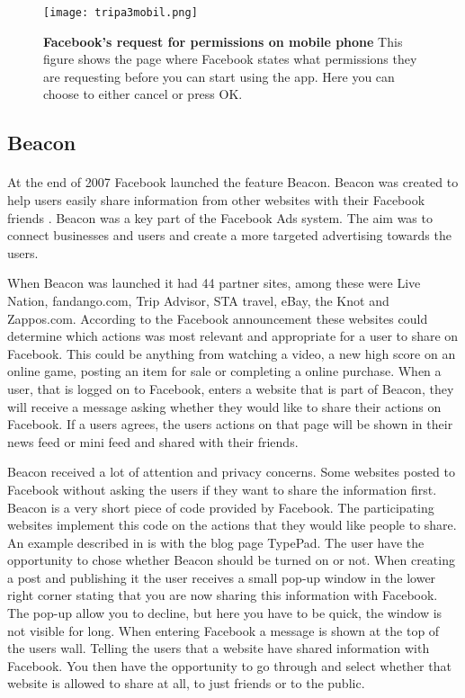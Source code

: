 \begin{figure}[h!]
\centering
\texttt{[image: tripa3mobil.png]}
\caption[Facebook's request for permissions on mobile phone]{\textbf{Facebook's request for permissions on mobile phone} This figure shows the page where Facebook states what permissions they are requesting before you can start using the app. Here you can choose to either cancel or press OK.} 
\label{fig:tripa3mobil}
\end{figure}



\subsection{Beacon}
\paragraph{}
At the end of 2007 Facebook launched the feature Beacon. Beacon was created to help users easily share information from other websites with their Facebook friends \cite{BeaconWebsites}. Beacon was a key part of the Facebook Ads system. The aim was to connect businesses and users and create a more targeted advertising towards the users. 

When Beacon was launched it had 44 partner sites, among these were Live Nation, fandango.com, Trip Advisor, STA travel, eBay, the Knot and Zappos.com. According to the Facebook announcement \cite{BeaconWebsites} these websites could determine which actions was most relevant and appropriate for a user to share on Facebook. This could be anything from watching a video, a new high score on an online game, posting an item for sale or completing a online purchase. When a user, that is logged on to Facebook, enters a website that is part of Beacon, they will receive a message asking whether they would like to share their actions on Facebook. If a users agrees, the users actions on that page will be shown in their news feed or mini feed and shared with their friends.  

Beacon received a lot of attention and privacy concerns. Some websites posted to Facebook without asking the users if they want to share the information first. Beacon is a very short piece of code provided by Facebook. The participating websites implement this code on the actions that they would like people to share. An example described in \cite{beaconMarketsPerspective} is with the blog page TypePad. The user have the opportunity to chose whether Beacon should be turned on or not. When creating a post and publishing it the user receives a small pop-up window in the lower right corner stating that you are now sharing this information with Facebook. The pop-up allow you to decline, but here you have to be quick, the window is not visible for long. When entering Facebook a message is shown at the top of the users wall. Telling the users that a website have shared information with Facebook. You then have the opportunity to go through and select whether that website is allowed to share at all, to just friends or to the public.  

